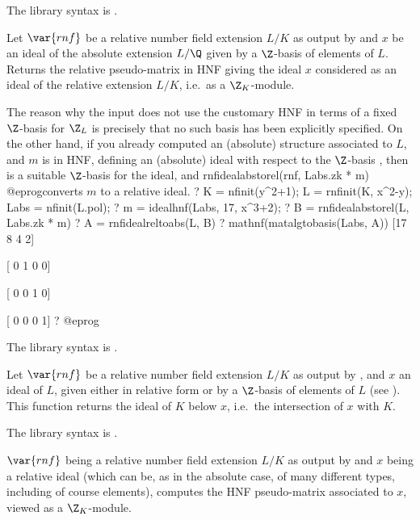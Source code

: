The library syntax is .

\label{se:rnfidealabstorel}
Let $\var{rnf}$ be a relative
number field extension $L/K$ as output by  and $x$ be an ideal of
the absolute extension $L/\Q$ given by a $\Z$-basis of elements of $L$.
Returns the relative pseudo-matrix in HNF giving the ideal $x$ considered as
an ideal of the relative extension $L/K$, i.e.~as a $\Z_K$-module.

The reason why the input does not use the customary HNF in terms of a fixed
$\Z$-basis for $\Z_L$ is precisely that no such basis has been explicitly
specified. On the other hand, if you already computed an (absolute) 
structure  associated to $L$, and $m$ is in HNF, defining
an (absolute) ideal with respect to the $\Z$-basis , then
 is a suitable $\Z$-basis for the ideal, and
\bprog
  rnfidealabstorel(rnf, Labs.zk * m)
@eprog\noindent converts $m$ to a relative ideal.
\bprog
? K = nfinit(y^2+1); L = rnfinit(K, x^2-y); Labs = nfinit(L.pol);
? m = idealhnf(Labs, 17, x^3+2);
? B = rnfidealabstorel(L, Labs.zk * m)
? A = rnfidealreltoabs(L, B)
? mathnf(matalgtobasis(Labs, A))
[17 8 4 2]

[ 0 1 0 0]

[ 0 0 1 0]

[ 0 0 0 1]
? %
@eprog

The library syntax is .

\label{se:rnfidealdown}
Let $\var{rnf}$ be a relative number
field extension $L/K$ as output by , and $x$ an ideal of
$L$, given either in relative form or by a $\Z$-basis of elements of $L$
(see ). This function returns the ideal of $K$
below $x$, i.e.~the intersection of $x$ with $K$.

The library syntax is .

\label{se:rnfidealhnf}
$\var{rnf}$ being a relative number
field extension $L/K$ as output by  and $x$ being a relative
ideal (which can be, as in the absolute case, of many different types,
including of course elements), computes the HNF pseudo-matrix associated to
$x$, viewed as a $\Z_K$-module.

